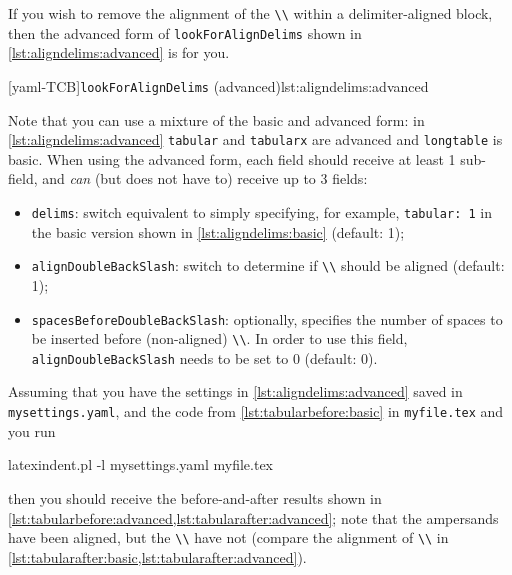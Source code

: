 	If you wish to remove the alignment of the \lstinline!\\! within a delimiter-aligned block, then the
	advanced form of \texttt{lookForAlignDelims} shown in \cref{lst:aligndelims:advanced} is for you.

	[yaml-TCB]{\texttt{lookForAlignDelims} (advanced)}{lst:aligndelims:advanced}

	Note that you can use a mixture of the basic and advanced form: in \cref{lst:aligndelims:advanced} \texttt{tabular} and \texttt{tabularx}
	are advanced and \texttt{longtable} is basic. When using the advanced form, each field should receive at least 1 sub-field, and \emph{can} (but does not have to) receive up to 3 fields:
	\begin{itemize}
		\item \texttt{delims}: switch equivalent to simply specifying, for example, \texttt{tabular: 1} in
		      the basic version shown in \cref{lst:aligndelims:basic} (default: 1);
		\item \texttt{alignDoubleBackSlash}: switch to determine if \lstinline!\\! should be aligned (default: 1);
		\item \texttt{spacesBeforeDoubleBackSlash}: optionally, specifies the number of spaces to be inserted
		      before (non-aligned) \lstinline!\\!. In order to use this field, \texttt{alignDoubleBackSlash} needs
		      to be set to 0 (default: 0).
	\end{itemize}

	Assuming that you have the settings in \cref{lst:aligndelims:advanced} saved in \texttt{mysettings.yaml}, and the code
	from \cref{lst:tabularbefore:basic} in \texttt{myfile.tex} and you run
	\begin{commandshell}
latexindent.pl -l mysettings.yaml myfile.tex 
\end{commandshell}
	then you should receive the before-and-after results shown in
	\cref{lst:tabularbefore:advanced,lst:tabularafter:advanced}; note that the ampersands have been aligned, but
	the \lstinline!\\! have not (compare the alignment of \lstinline!\\! in \cref{lst:tabularafter:basic,lst:tabularafter:advanced}).

	\begin{minipage}{.45\textwidth}
	\end{minipage}%
	\hfill
	\begin{minipage}{.45\textwidth}
	\end{minipage}%

